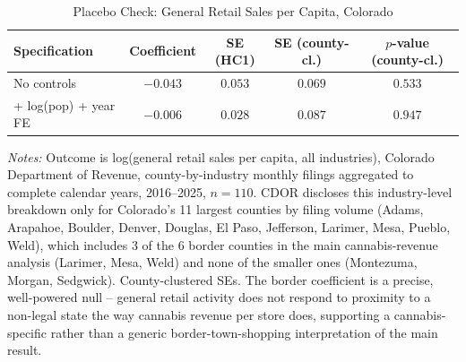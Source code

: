 \begin{table}[htbp]
\centering
\caption{Placebo Check: General Retail Sales per Capita, Colorado}
\label{tab:placebo_general_retail}
\begin{tabular}{lcccc}
\toprule
Specification & Coefficient & SE (HC1) & SE (county-cl.) & $p$-value (county-cl.) \\
\midrule
No controls & $-0.043$ & $0.053$ & $0.069$ & $0.533$ \\
+ log(pop) + year FE & $-0.006$ & $0.028$ & $0.087$ & $0.947$ \\
\bottomrule
\end{tabular}
\begin{minipage}{0.95\textwidth}
\vspace{0.3em}
\footnotesize
\textit{Notes:} Outcome is log(general retail sales per capita, all industries), Colorado Department of
Revenue, county-by-industry monthly filings aggregated to complete calendar years, 2016--2025,
$n=110$. CDOR discloses this industry-level breakdown only for Colorado's 11 largest counties by
filing volume (Adams, Arapahoe, Boulder, Denver, Douglas, El Paso, Jefferson, Larimer, Mesa, Pueblo,
Weld), which includes 3 of the 6 border counties in the main cannabis-revenue analysis (Larimer, Mesa,
Weld) and none of the smaller ones (Montezuma, Morgan, Sedgwick). County-clustered SEs. The border
coefficient is a precise, well-powered null -- general retail activity does not respond to proximity to a
non-legal state the way cannabis revenue per store does, supporting a cannabis-specific rather than a
generic border-town-shopping interpretation of the main result.
\end{minipage}
\end{table}
